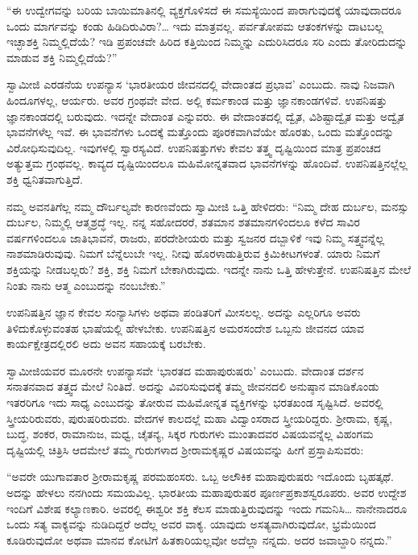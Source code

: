  “ಈ ಉದ್ವೇಗವನ್ನು ಬರಿಯ ಬಾಯಿಮಾತಿನಲ್ಲಿ ವ್ಯಕ್ತಗೊಳಿಸದೆ ಈ ಸಮಸ್ಯೆಯಿಂದ ಪಾರಾಗುವುದಕ್ಕೆ ಯಾವುದಾದರೂ ಒಂದು ಮಾರ್ಗವನ್ನು ಕಂಡು ಹಿಡಿದಿರುವಿರಾ?… ಇದು ಮಾತ್ರವಲ್ಲ. ಪರ್ವತೋಪಮ ಆತಂಕಗಳನ್ನು ದಾಟಬಲ್ಲ ಇಚ್ಛಾಶಕ್ತಿ ನಿಮ್ಮಲ್ಲಿದೆಯೆ? ಇಡಿ ಪ್ರಪಂಚವೇ ಹಿರಿದ ಕತ್ತಿಯಿಂದ ನಿಮ್ಮನ್ನು ಎದುರಿಸಿದರೂ ಸರಿ ಎಂದು ತೋರಿದುದನ್ನು ಮಾಡುವ ಶಕ್ತಿ ನಿಮ್ಮಲ್ಲಿದೆಯೆ?” 

 ಸ್ವಾಮೀಜಿ ಎರಡನೆಯ ಉಪನ್ಯಾಸ ‘ಭಾರತೀಯರ ಜೀವನದಲ್ಲಿ ವೇದಾಂತದ ಪ್ರಭಾವ’ ಎಂಬುದು. ನಾವು ನಿಜವಾಗಿ ಹಿಂದೂಗಳಲ್ಲ, ಆರ್ಯರು. ಅವರ ಗ್ರಂಥವೇ ವೇದ. ಅಲ್ಲಿ ಕರ್ಮಕಾಂಡ ಮತ್ತು ಜ್ಞಾನಕಾಂಡಗಳಿವೆ. ಉಪನಿಷತ್ತು ಜ್ಞಾನಕಾಂಡದಲ್ಲಿ ಬರುವುದು. ಇದನ್ನೇ ವೇದಾಂತ ಎನ್ನುವರು. ಈ ವೇದಾಂತದಲ್ಲಿ ದ್ವೈತ, ವಿಶಿಷ್ಟಾದ್ವೈತ ಮತ್ತು ಅದ್ವೈತ ಭಾವನೆಗಳೆಲ್ಲ ಇವೆ. ಈ ಭಾವನೆಗಳು ಒಂದಕ್ಕೆ ಮತ್ತೊಂದು ಪೂರಕವಾಗಿವೆಯೇ ಹೊರತು, ಒಂದು ಮತ್ತೊಂದನ್ನು ವಿರೋಧಿಸುವುದಿಲ್ಲ. ಇವುಗಳಲ್ಲಿ ಸ್ವಾರಸ್ಯವಿದೆ. ಉಪನಿಷತ್ತುಗಳು ಕೇವಲ ತತ್ತ್ವ ದೃಷ್ಟಿಯಿಂದ ಮಾತ್ರ ಪ್ರಪಂಚದ ಅತ್ಯುತ್ತಮ ಗ್ರಂಥವಲ್ಲ. ಕಾವ್ಯದ ದೃಷ್ಟಿಯಿಂದಲೂ ಮಹಿಮೋನ್ನತವಾದ ಭಾವನೆಗಳನ್ನು ಹೊಂದಿವೆ. ಉಪನಿಷತ್ತಿನಲ್ಲೆಲ್ಲ ಶಕ್ತಿ ಧ್ವನಿತವಾಗುತ್ತಿದೆ. 

 ನಮ್ಮ ಅವನತಿಗೆಲ್ಲ ನಮ್ಮ ದೌರ್ಬಲ್ಯವೇ ಕಾರಣವೆಂದು ಸ್ವಾಮೀಜಿ ಒತ್ತಿ ಹೇಳಿದರು: “ನಿಮ್ಮ ದೇಹ ದುರ್ಬಲ, ಮನಸ್ಸು ದುರ್ಬಲ, ನಿಮ್ಮಲ್ಲಿ ಆತ್ಮಶ್ರದ್ಧೆ ಇಲ್ಲ. ನನ್ನ ಸಹೋದರರೆ, ಶತಮಾನ ಶತಮಾನಗಳಿಂದಲೂ ಕಳೆದ ಸಾವಿರ ವರ್ಷಗಳಿಂದಲೂ ಜಾತಿಭಾವನೆ, ರಾಜರು, ಪರದೇಶೀಯರು ಮತ್ತು ಸ್ವಜನರ ದಬ್ಬಾಳಿಕೆ ಇವು ನಿಮ್ಮ ಸತ್ತ್ವವನ್ನೆಲ್ಲ ನಾಶಮಾಡಿರುವುವು. ನಿಮಗೆ ಬೆನ್ನೆಲುಬೇ ಇಲ್ಲ. ನೀವು ಹೊರಳಾಡುತ್ತಿರುವ ಕ್ರಿಮಿಕೀಟಗಳಂತೆ. ಯಾರು ನಿಮಗೆ ಶಕ್ತಿಯನ್ನು ನೀಡಬಲ್ಲರು? ಶಕ್ತಿ, ಶಕ್ತಿ ನಿಮಗೆ ಬೇಕಾಗಿರುವುದು. ಇದನ್ನೇ ನಾನು ಒತ್ತಿ ಹೇಳುತ್ತೇನೆ. ಉಪನಿಷತ್ತಿನ ಮೇಲೆ ನಿಂತು ನಾನು ಆತ್ಮ ಎಂಬುದನ್ನು ನಂಬಬೇಕು.” 

 ಉಪನಿಷತ್ತಿನ ಜ್ಞಾನ ಕೇವಲ ಸಂನ್ಯಾಸಿಗಳು ಅಥವಾ ಪಂಡಿತರಿಗೆ ಮೀಸಲಲ್ಲ. ಅದನ್ನು ಎಲ್ಲರಿಗೂ ಅವರು ತಿಳಿದುಕೊಳ್ಳುವಂತಹ ಭಾಷೆಯಲ್ಲಿ ಹೇಳಬೇಕು. ಉಪನಿಷತ್ತಿನ ಅಮರಸಂದೇಶ ಒಬ್ಬನು ಜೀವನದ ಯಾವ ಕಾರ್ಯಕ್ಷೇತ್ರದಲ್ಲಿರಲಿ ಅದು ಅವನ ಸಹಾಯಕ್ಕೆ ಬರಬೇಕು. 

 ಸ್ವಾಮೀಜಿಯವರ ಮೂರನೇ ಉಪನ್ಯಾಸವೇ ‘ಭಾರತದ ಮಹಾಪುರುಷರು’ ಎಂಬುದು. ವೇದಾಂತ ದರ್ಶನ ಸನಾತನವಾದ ತತ್ತ್ವದ ಮೇಲೆ ನಿಂತಿದೆ. ಅದನ್ನು ವಿವರಿಸುವುದಕ್ಕೆ ತಮ್ಮ ಜೀವನದಲಿ ಅನುಷ್ಠಾನ ಮಾಡಿಕೊಂಡು ಇತರರಿಗೂ ಇದು ಸಾಧ್ಯ ಎಂಬುದನ್ನು ತೋರುವ ಮಹಿಮೋನ್ನತ ವ್ಯಕ್ತಿಗಳನ್ನು ಭರತಖಂಡ ಸೃಷ್ಟಿಸಿದೆ. ಅವರಲ್ಲಿ ಸ್ತ್ರೀಯರಿರುವರು, ಪುರುಷರಿರುವರು. ವೇದಗಳ ಕಾಲದಲ್ಲೆ ಮಹಾ ವಿದ್ವಾಂಸರಾದ ಸ್ತ್ರೀಯರಿದ್ದರು. ಶ‍್ರೀರಾಮ, ಕೃಷ್ಣ, ಬುದ್ಧ, ಶಂಕರ, ರಾಮಾನುಜ, ಮಧ್ವ, ಚೈತನ್ಯ, ಸಿಕ್ಕರ ಗುರುಗಳು ಮುಂತಾದವರ ವಿಷಯವನ್ನೆಲ್ಲ ವಿಹಂಗಮ ದೃಷ್ಟಿಯಲ್ಲಿ ಚಿತ್ರಿಸಿ ಆದಮೇಲೆ ತಮ್ಮ ಗುರುಗಳಾದ ಶ‍್ರೀರಾಮಕೃಷ್ಣರ ವಿಷಯವನ್ನು ಹೀಗೆ ಪ್ರಸ್ತಾಪಿಸುವರು: 

 “ಅವರೇ ಯುಗಾವತಾರ ಶ‍್ರೀರಾಮಕೃಷ್ಣ ಪರಮಹಂಸರು. ಒಬ್ಬ ಅಲೌಕಿಕ ಮಹಾಪುರುಷರು ಇದೊಂದು ಬೃಹತ್ಕಥೆ. ಅದನ್ನು ಹೇಳಲು ನನಗಿಂದು ಸಮಯವಿಲ್ಲ. ಭಾರತೀಯ ಮಹಾಪುರುಷರ ಪೂರ್ಣಪ್ರಕಾಶಸ್ವರೂಪರು. ಅವರ ಉದ್ದೇಶ ಇಂದಿಗೆ ವಿಶೇಷ ಕಲ್ಯಾಣಕಾರಿ. ಅವರಲ್ಲಿ ಈಶ್ವರೀ ಶಕ್ತಿ ಕೆಲಸ ಮಾಡುತ್ತಿರುವುದನ್ನು ಇಂದು ಗಮನಿಸಿ… ನಾನೇನಾದರೂ ಒಂದು ಸತ್ಯ ವಾಕ್ಯವನ್ನು ನುಡಿದಿದ್ದರೆ ಅದೆಲ್ಲ ಅವರ ವಾಕ್ಯ. ಯಾವುದು ಅಸತ್ಯವಾಗಿರುವುದೋ, ಭ್ರಮೆಯಿಂದ ಕೂಡಿರುವುದೋ ಅಥವಾ ಮಾನವ ಕೋಟಿಗೆ ಹಿತಕಾರಿಯಲ್ಲವೋ ಅದೆಲ್ಲಾ ನನ್ನದು. ಅದರ ಜವಾಬ್ದಾರಿ ನನ್ನದು.” 

